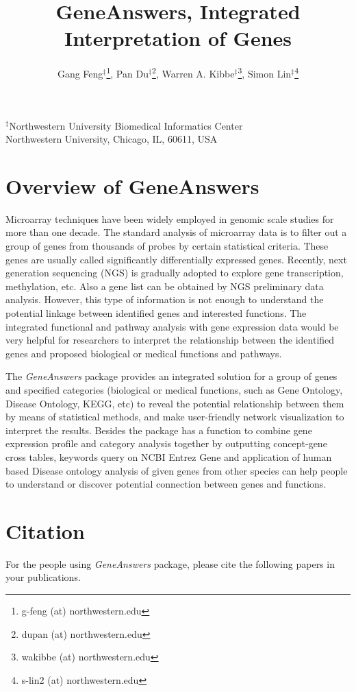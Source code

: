 \documentclass[a4paper]{article}
\author{Gang Feng$^\ddagger$\footnote{g-feng (at) northwestern.edu}, Pan Du$^\ddagger$\footnote{dupan (at) northwestern.edu}, Warren A. Kibbe$^\ddagger$\footnote{wakibbe (at) northwestern.edu}, Simon Lin$^\ddagger$\footnote{s-lin2 (at) northwestern.edu}}
\newcommand{\Rpackage}[1]{{\textit{#1}}}
\begin{document}

\title{GeneAnswers, Integrated Interpretation of Genes }
\maketitle
\begin{center}$^\ddagger$Northwestern University Biomedical Informatics Center \\ Northwestern University, Chicago, IL, 60611, USA
\end{center}

\tableofcontents

\section{Overview of GeneAnswers}
Microarray techniques have been widely employed in genomic scale studies for more than one decade. The standard analysis of microarray data is to filter out a group of genes from thousands of probes by certain statistical criteria. These genes are usually called significantly differentially expressed genes. Recently, next generation sequencing (NGS) is gradually adopted to explore gene transcription, methylation, etc. Also a gene list can be obtained by NGS preliminary data analysis. However, this type of information is not enough to understand the potential linkage between identified genes and interested functions. The integrated functional and pathway analysis with gene expression data would be very helpful for researchers to interpret the relationship between the identified genes and proposed biological or medical functions and pathways.

The \Rpackage{GeneAnswers} package provides an integrated solution for a group of genes and specified categories (biological or medical functions, such as Gene Ontology, Disease Ontology, KEGG, etc) to reveal the potential relationship between them by means of statistical methods, and make user-friendly network visualization to interpret the results. Besides the package has a function to combine gene expression profile and category analysis together by outputting concept-gene cross tables, keywords query on NCBI Entrez Gene and application of human based Disease ontology analysis of given genes from other species can help people to understand or discover potential connection between genes and functions.

\section{Citation}
For the people using \Rpackage{GeneAnswers} package, please cite the following papers in your publications.
\end{document}
